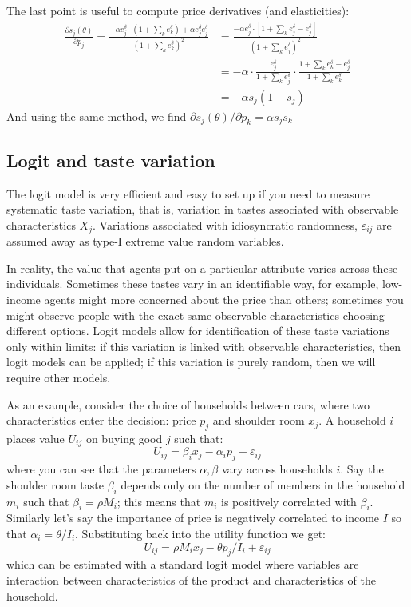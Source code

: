 \documentclass[12pt]{report}
\begin{document}
The last point is useful to compute price derivatives (and elasticities): \begin{align*}
\frac{\partial s_j(\theta)}{\partial p_j} = \frac{-\alpha e^\delta_j \cdot (1 + \sum_{k}e^\delta_k ) + \alpha e^\delta_j e^\delta_j }{(1 + \sum_{k} e^\delta_k )^2} & = \frac{-\alpha e^\delta_j\cdot\left[ 1 + \sum_{k}e^\delta_j - e^\delta_j\right]}{(1 + \sum_{k}e^\delta_j)^2} \\ 
& = - \alpha \cdot \frac{e^\delta_j}{1 + \sum_{k}e^\delta_j} \cdot \frac{1 + \sum_{k}e^\delta_k - e^\delta_j}{1 + \sum_{k}e^\delta_k} \\
& = - \alpha s_j (1 - s_j)
\end{align*} And using the same method, we find $\partial s_j(\theta)/\partial p_k = \alpha s_j s_k $

\subsection{Logit and taste variation}\label{sssec:tastevar}

The logit model is very efficient and easy to set up if you need to measure systematic taste variation, that is, variation in tastes associated with observable characteristics $X_j$. Variations associated with idiosyncratic randomness, $\varepsilon_{ij}$ are assumed away as type-I extreme value random variables.

In reality, the value that agents put on a particular attribute varies across these individuals. Sometimes these tastes vary in an identifiable way, for example, low-income agents might more concerned about the price than others; sometimes you might observe people with the exact same observable characteristics choosing different options. Logit models allow for identification of these taste variations only within limits: if this variation is linked with observable characteristics, then logit models can be applied; if this variation is purely random, then we will require other models.

As an example, consider the choice of households between cars, where two characteristics enter the decision: price $p_j$ and shoulder room $x_j$. A household $i$ places value $U_{ij}$ on buying good $j$ such that: $$U_{ij} = \beta_i x_j - \alpha_i p_j + \varepsilon_{ij} $$ where you can see that the parameters $\alpha, \beta$ vary across households $i$. Say the shoulder room taste $\beta_i$ depends only on the number of members in the household $m_i$ such that $\beta_i = \rho M_i$; this means that $m_i$ is positively correlated with $\beta_i$. Similarly let's say the importance of price is negatively correlated to income $I$ so that $\alpha_i = \theta/I_i$. Substituting back into the utility function we get: $$U_{ij} = \rho M_i x_j - \theta p_j/I_i + \varepsilon_{ij} $$ which can be estimated with a standard logit model where variables are interaction between characteristics of the product and characteristics of the household.
\end{document}
